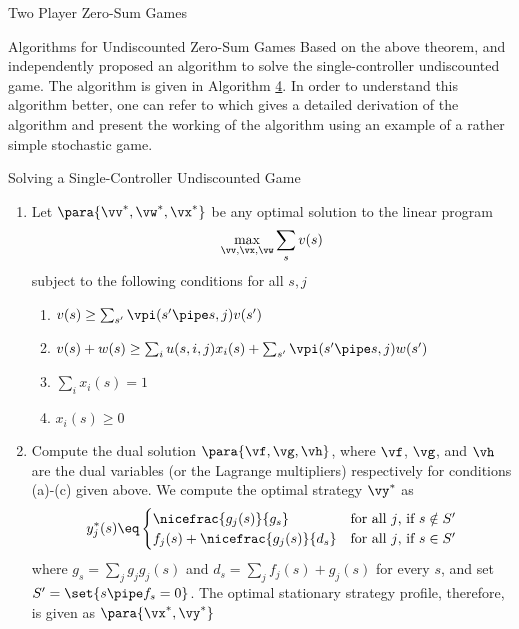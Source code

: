 \documentclass{article}
\begin{document}
\begin{psection}{Two Player Zero-Sum Games}
\begin{psubsection}{Algorithms for Undiscounted Zero-Sum Games}
		Based on the above theorem, \cite{vrieze} and \cite{hodijk} independently proposed an algorithm to solve the single-controller undiscounted game. The algorithm is given in Algorithm \hyperlink{algo:4}{4}. In order to understand this algorithm better, one can refer to \citep{single-controller} which gives a detailed derivation of the algorithm and \cite{survey} present the working of the algorithm using an example of a rather simple stochastic game.

		\begin{algo}[0.9\textwidth]{Solving a Single-Controller Undiscounted Game}

			\begin{enumerate}
				\item Let $\para{\vv^{\ast}, \vw^{\ast}, \vx^{\ast}}$ be any optimal solution to the linear program
					\begin{align*}
						\max_{\vv, \vx, \vw} \sum_{s} v(s)
					\end{align*}
					subject to the following conditions for all $s, j$
					\begin{enumerate}
						\item $v(s) \ge \sum_{s'} \vpi(s' \pipe s, j)v(s')$
						\item $v(s) + w(s) \ge \sum_{i} u(s, i, j) x_i(s) + \sum_{s'} \vpi(s' \pipe s, j) w(s')$
						\item $\sum_{i} x_i(s) = 1$
						\item $x_i(s) \ge 0$
					\end{enumerate}
				\item Compute the dual solution $\para{\vf, \vg, \vh}$, where $\vf$, $\vg$, and $\vh$ are the dual variables (or the Lagrange multipliers) respectively for conditions (a)-(c) given above. We compute the optimal strategy $\vy^\ast$ as
					\begin{align*}
						y_j^\ast(s) \eq \begin{cases}
							\nicefrac{g_j(s)}{g_s} & \text{for all $j$, if $s \notin S'$} \\
							f_j(s) + \nicefrac{g_j(s)}{d_s} & \text{for all $j$, if $s \in S'$}
						\end{cases}
					\end{align*}
					where $g_s = \sum_{j} g_j g_j(s)$ and $d_s = \sum_{j} f_j(s) + g_j(s)$ for every $s$, and set $S' = \set{s \pipe f_s = 0}$. The optimal stationary strategy profile, therefore, is given as $\para{\vx^\ast, \vy^\ast}$
			\end{enumerate}


\end{algo}
\end{psubsection}
\end{psection}
\end{document}
